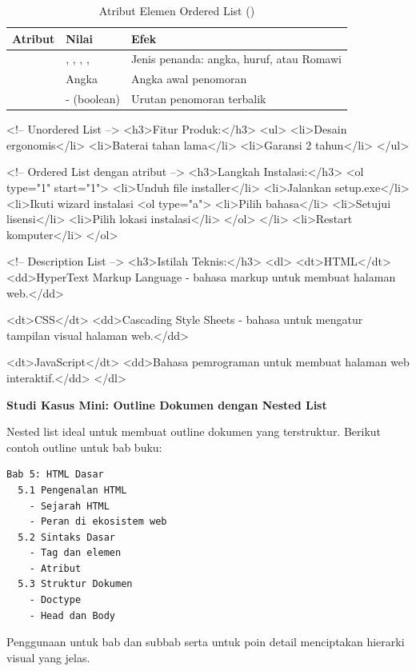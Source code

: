 \begin{table}[H]
\centering
\begin{tabular}{|P{3cm}|P{2.5cm}|P{6cm}|}
\hline
\textbf{Atribut} & \textbf{Nilai} & \textbf{Efek} \\
\hline
{} & , , , ,  & Jenis penanda: angka, huruf, atau Romawi \\
\hline
{} & Angka & Angka awal penomoran \\
\hline
{} & - (boolean) & Urutan penomoran terbalik \\
\hline
\end{tabular}
\caption{Atribut Elemen Ordered List ()}
\label{tab:ol-attributes}
\end{table}

\begin{webcode}[language=HTML, caption={Contoh Berbagai Jenis Daftar}]
<!-- Unordered List -->
<h3>Fitur Produk:</h3>
<ul>
  <li>Desain ergonomis</li>
  <li>Baterai tahan lama</li>
  <li>Garansi 2 tahun</li>
</ul>

<!-- Ordered List dengan atribut -->
<h3>Langkah Instalasi:</h3>
<ol type="1" start="1">
  <li>Unduh file installer</li>
  <li>Jalankan setup.exe</li>
  <li>Ikuti wizard instalasi
    <ol type="a">
      <li>Pilih bahasa</li>
      <li>Setujui lisensi</li>
      <li>Pilih lokasi instalasi</li>
    </ol>
  </li>
  <li>Restart komputer</li>
</ol>

<!-- Description List -->
<h3>Istilah Teknis:</h3>
<dl>
  <dt>HTML</dt>
  <dd>HyperText Markup Language - bahasa markup 
      untuk membuat halaman web.</dd>
  
  <dt>CSS</dt>
  <dd>Cascading Style Sheets - bahasa untuk 
      mengatur tampilan visual halaman web.</dd>
  
  <dt>JavaScript</dt>
  <dd>Bahasa pemrograman untuk membuat halaman 
      web interaktif.</dd>
</dl>
\end{webcode}

\begin{contoh}
\textbf{Studi Kasus Mini: Outline Dokumen dengan Nested List}

Nested list ideal untuk membuat outline dokumen yang terstruktur. Berikut contoh outline untuk bab buku:

\begin{verbatim}
Bab 5: HTML Dasar
  5.1 Pengenalan HTML
    - Sejarah HTML
    - Peran di ekosistem web
  5.2 Sintaks Dasar
    - Tag dan elemen
    - Atribut
  5.3 Struktur Dokumen
    - Doctype
    - Head dan Body
\end{verbatim}

Penggunaan  untuk bab dan subbab serta  untuk poin detail menciptakan hierarki visual yang jelas.
\end{contoh}

